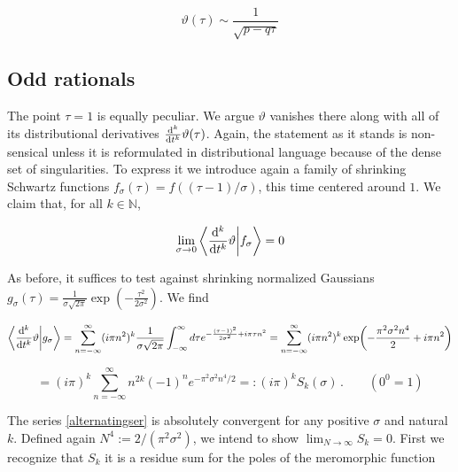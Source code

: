 \documentclass{article}
\newcommand{\intR}{\int_{-\infty}^\infty}
\newcommand{\sumZ}{\sum_{n=-\infty}^{\infty}}
\begin{document}
\begin{equation*}
    \vartheta(\tau) \sim \frac{1}{\sqrt{p-q\tau}}
\end{equation*}



\subsection{Odd rationals}\label{sec:oddrationals}

The point $\tau=1$ is equally peculiar. We argue $\vartheta$ vanishes there along with all of its distributional derivatives $\dv[k]{t} \vartheta(\tau)$. Again, the statement as it stands is non-sensical unless it is reformulated in distributional language because of the dense set of singularities. To express it we introduce again a family of shrinking Schwartz functions $f_\sigma(\tau) = f((\tau-1)/\sigma)$, this time centered around $1$. We claim that, for all $k \in \mathbb{N}$,

\begin{equation*}
    \lim_{\sigma \rightarrow 0} \bra{ \dv[k]{t}\vartheta}\ket{ f_\sigma } = 0
\end{equation*}

As before, it suffices to test against shrinking normalized Gaussians $g_\sigma(\tau) = \frac{1}{\sigma\sqrt{2\pi}} \exp( - \frac{\tau^2}{2\sigma^2} )$. We find

\begin{equation}
    \bra{\dv[k]{t}\vartheta}\ket{g_\sigma} = \sumZ (i\pi n^2)^k \frac{1}{\sigma\sqrt{2\pi}} \intR d\tau e^{- \frac{(\tau-1)^2}{2\sigma^2} + i\pi\tau n^2} = \sumZ (i\pi n^2)^k \exp( - \frac{\pi^2 \sigma^2 n^4}{2} + i\pi n^2)
\end{equation}

\begin{equation}\label{alternatingser}
    = (i\pi)^k \sumZ n^{2k} (-1)^n e^{-\pi^2 \sigma^2 n^4/2} =: (i\pi)^k S_k(\sigma)\,.\quad\quad(0^0 = 1)
\end{equation}

The series \eqref{alternatingser} is absolutely convergent for any positive $\sigma$ and natural $k$. Defined again $N^4 := 2/(\pi^2 \sigma^2)$, we intend to show  $\lim_{N \rightarrow \infty} S_k = 0$. First we recognize that $S_k$ it is a residue sum for the poles of the meromorphic function
\end{document}

